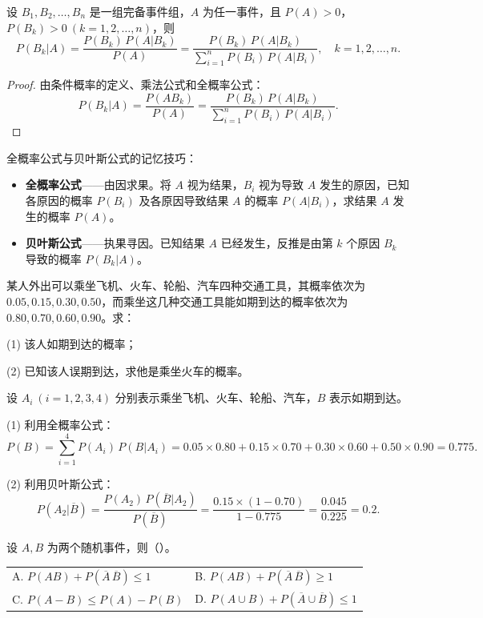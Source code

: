 \documentclass[lang=cn,11pt]{elegantbook}
\begin{document}
\begin{theorem}[贝叶斯公式] \label{thm:bayes}
设 \(B_1, B_2, \dots, B_n\) 是一组完备事件组，\(A\) 为任一事件，且 \(P(A) > 0\)，\(P(B_k) > 0\ (k=1,2,\dots,n)\)，则
\[
P(B_k|A) = \frac{P(B_k)\,P(A|B_k)}{P(A)} = \frac{P(B_k)\,P(A|B_k)}{\sum_{i=1}^{n} P(B_i)\,P(A|B_i)}, \quad k=1,2,\dots,n.
\]
\end{theorem}
\begin{proof}
由条件概率的定义、乘法公式和全概率公式：
\[
P(B_k|A) = \frac{P(AB_k)}{P(A)} = \frac{P(B_k)\,P(A|B_k)}{\displaystyle\sum_{i=1}^{n} P(B_i)\,P(A|B_i)}.
\]
\end{proof}

\begin{note}
全概率公式与贝叶斯公式的记忆技巧：
\begin{itemize}
    \item \textbf{全概率公式}——由因求果。将 \(A\) 视为结果，\(B_i\) 视为导致 \(A\) 发生的原因，已知各原因的概率 \(P(B_i)\) 及各原因导致结果 \(A\) 的概率 \(P(A|B_i)\)，求结果 \(A\) 发生的概率 \(P(A)\)。
    \item \textbf{贝叶斯公式}——执果寻因。已知结果 \(A\) 已经发生，反推是由第 \(k\) 个原因 \(B_k\) 导致的概率 \(P(B_k|A)\)。
\end{itemize}
\end{note}

\begin{exercise}\label{exer:1-8}
某人外出可以乘坐飞机、火车、轮船、汽车四种交通工具，其概率依次为 \(0.05, 0.15, 0.30, 0.50\)，而乘坐这几种交通工具能如期到达的概率依次为 \(0.80, 0.70, 0.60, 0.90\)。求：
\par
(1) 该人如期到达的概率；\par
(2) 已知该人误期到达，求他是乘坐火车的概率。
\end{exercise}

\begin{solution}
设 \(A_i\ (i=1,2,3,4)\) 分别表示乘坐飞机、火车、轮船、汽车，\(B\) 表示如期到达。

(1) 利用全概率公式：
\[
P(B) = \sum_{i=1}^{4} P(A_i)\,P(B|A_i) = 0.05 \times 0.80 + 0.15 \times 0.70 + 0.30 \times 0.60 + 0.50 \times 0.90 = 0.775.
\]

(2) 利用贝叶斯公式：
\[
P(A_2|\overline{B}) = \frac{P(A_2)\,P(\overline{B}|A_2)}{P(\overline{B})} = \frac{0.15 \times (1-0.70)}{1-0.775} = \frac{0.045}{0.225} = 0.2.
\]
\end{solution}

\begin{exercise}\label{exer:1-9}
设 \(A, B\) 为两个随机事件，则（\quad）。\\
\begin{tabular}{ll}
A. \(P(AB)+P(\overline{A}\,\overline{B})\le 1\) & B. \(P(AB)+P(\overline{A}\,\overline{B})\ge 1\) \\[4pt]
C. \(P(A-B)\le P(A)-P(B)\) & D. \(P(A\cup B)+P(\overline{A}\cup\overline{B})\le 1\)
\end{tabular}
\end{exercise}
\end{document}

